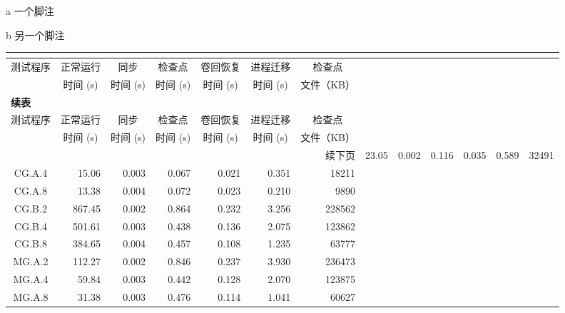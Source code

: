 \documentclass{sjtureport}
\begin{document}
\begin{ThreePartTable}
	\begin{TableNotes}
	\item[a] 一个脚注
	\item[b] 另一个脚注
	\end{TableNotes}
	\begin{longtable}[c]{c*{6}{r}}
	\bicaption{实验数据}{Experimental data}
	\label{tab:performance} \\
	\toprule
	测试程序 & \multicolumn{1}{c}{正常运行} & \multicolumn{1}{c}{同步}
		& \multicolumn{1}{c}{检查点} & \multicolumn{1}{c}{卷回恢复}
		& \multicolumn{1}{c}{进程迁移} & \multicolumn{1}{c}{检查点} \\
	& \multicolumn{1}{c}{时间 (s)} & \multicolumn{1}{c}{时间 (s)}
		& \multicolumn{1}{c}{时间 (s)} & \multicolumn{1}{c}{时间 (s)}
		& \multicolumn{1}{c}{时间 (s)} &文件（KB）\\
	\midrule
	\endfirsthead
	\multicolumn{7}{l}{\textbf{续表~\thetable}} \\
	\toprule
	测试程序 & \multicolumn{1}{c}{正常运行} & \multicolumn{1}{c}{同步}
		& \multicolumn{1}{c}{检查点} & \multicolumn{1}{c}{卷回恢复}
		& \multicolumn{1}{c}{进程迁移} & \multicolumn{1}{c}{检查点} \\
	& \multicolumn{1}{c}{时间 (s)} & \multicolumn{1}{c}{时间 (s)}
		& \multicolumn{1}{c}{时间 (s)} & \multicolumn{1}{c}{时间 (s)}
		& \multicolumn{1}{c}{时间 (s)}&文件（KB）\\
	\midrule
	\endhead
	\hline
	\multicolumn{7}{r}{续下页}
	\endfoot
	\insertTableNotes
	\endlastfoot
	CG.A.2 & 23.05 & 0.002 & 0.116 & 0.035 & 0.589 & 32491 \\
	CG.A.4 & 15.06 & 0.003 & 0.067 & 0.021 & 0.351 & 18211 \\
	CG.A.8 & 13.38 & 0.004 & 0.072 & 0.023 & 0.210 & 9890 \\
	CG.B.2 & 867.45 & 0.002 & 0.864 & 0.232 & 3.256 & 228562 \\
	CG.B.4 & 501.61 & 0.003 & 0.438 & 0.136 & 2.075 & 123862 \\
	CG.B.8 & 384.65 & 0.004 & 0.457 & 0.108 & 1.235 & 63777 \\
	MG.A.2 & 112.27 & 0.002 & 0.846 & 0.237 & 3.930 & 236473 \\
	MG.A.4 & 59.84 & 0.003 & 0.442 & 0.128 & 2.070 & 123875 \\
	MG.A.8 & 31.38 & 0.003 & 0.476 & 0.114 & 1.041 & 60627 \\

\end{longtable}
\end{ThreePartTable}
\end{document}

